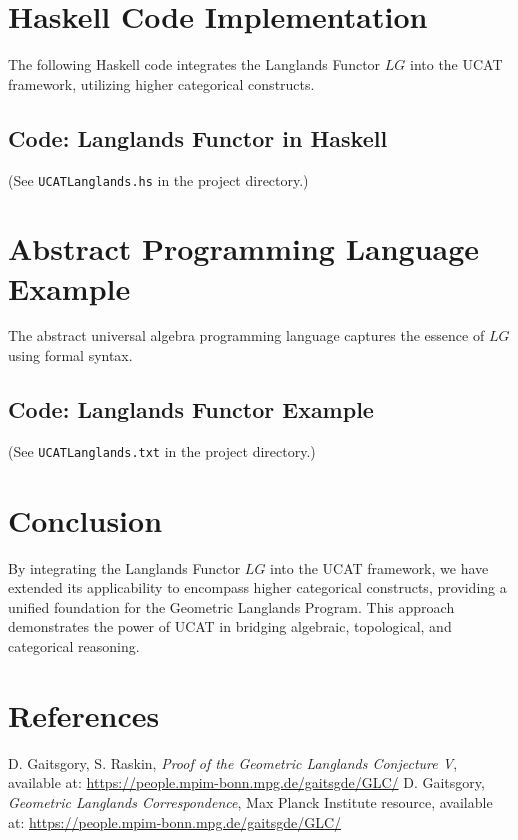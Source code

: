 \documentclass{article}
\begin{document}
\section{Haskell Code Implementation}

The following Haskell code integrates the Langlands Functor \( LG \) into the UCAT framework, utilizing higher categorical constructs.

\subsection{Code: Langlands Functor in Haskell}
(See \texttt{UCATLanglands.hs} in the project directory.)

\section{Abstract Programming Language Example}

The abstract universal algebra programming language captures the essence of \( LG \) using formal syntax.

\subsection{Code: Langlands Functor Example}
(See \texttt{UCATLanglands.txt} in the project directory.)

\section{Conclusion}

By integrating the Langlands Functor \( LG \) into the UCAT framework, we have extended its applicability to encompass higher categorical constructs, providing a unified foundation for the Geometric Langlands Program. This approach demonstrates the power of UCAT in bridging algebraic, topological, and categorical reasoning.

\section*{References}

\begin{thebibliography}{9}
 D. Gaitsgory, S. Raskin, \textit{Proof of the Geometric Langlands Conjecture V}, available at: \url{https://people.mpim-bonn.mpg.de/gaitsgde/GLC/}
 D. Gaitsgory, \textit{Geometric Langlands Correspondence}, Max Planck Institute resource, available at: \url{https://people.mpim-bonn.mpg.de/gaitsgde/GLC/}
\end{thebibliography}
\end{document}
